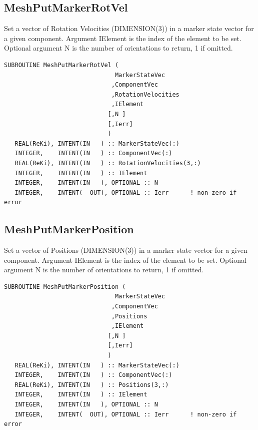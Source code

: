\documentclass[11pt]{article}
\begin{document}
\subsection{MeshPutMarkerRotVel}
Set a vector of Rotation Velocities (DIMENSION(3)) in a marker state vector for a given component.
Argument IElement is the index of the element to be set.
Optional argument N is the number of orientations to return, 1 if omitted.
\begin{verbatim}
SUBROUTINE MeshPutMarkerRotVel ( 
                               MarkerStateVec
                              ,ComponentVec 
                              ,RotationVelocities
                              ,IElement
                             [,N ]
                             [,Ierr]
                             )
   REAL(ReKi), INTENT(IN   ) :: MarkerStateVec(:)
   INTEGER,    INTENT(IN   ) :: ComponentVec(:)
   REAL(ReKi), INTENT(IN   ) :: RotationVelocities(3,:)
   INTEGER,    INTENT(IN   ) :: IElement
   INTEGER,    INTENT(IN   ), OPTIONAL :: N
   INTEGER,    INTENT(  OUT), OPTIONAL :: Ierr 		! non-zero if error
\end{verbatim}

\subsection{MeshPutMarkerPosition}
Set a vector of Positions (DIMENSION(3)) in a marker state vector for a given component.
Argument IElement is the index of the element to be set.
Optional argument N is the number of orientations to return, 1 if omitted.
\begin{verbatim}
SUBROUTINE MeshPutMarkerPosition ( 
                               MarkerStateVec
                              ,ComponentVec 
                              ,Positions
                              ,IElement
                             [,N ]
                             [,Ierr]
                             )
   REAL(ReKi), INTENT(IN   ) :: MarkerStateVec(:)
   INTEGER,    INTENT(IN   ) :: ComponentVec(:)
   REAL(ReKi), INTENT(IN   ) :: Positions(3,:)
   INTEGER,    INTENT(IN   ) :: IElement
   INTEGER,    INTENT(IN   ), OPTIONAL :: N
   INTEGER,    INTENT(  OUT), OPTIONAL :: Ierr 		! non-zero if error
\end{verbatim}
\end{document}
